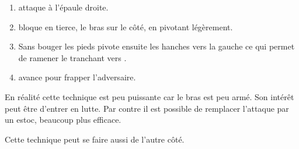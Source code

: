 \begin{technique}

\begin{enumerate}
	\item \A attaque à l'épaule droite.
	
	\item \D bloque en tierce, le bras sur le côté, en pivotant légèrement.
	
	\item Sans bouger les pieds \D pivote ensuite les hanches vers la gauche ce qui permet de ramener le tranchant vers \A.
	
	\item \D avance pour frapper l'adversaire.
\end{enumerate}

En réalité cette technique est peu puissante car le bras est peu armé.
Son intérêt peut être d'entrer en lutte.
Par contre il est possible de remplacer l'attaque par un estoc, beaucoup plus efficace.

Cette technique peut se faire aussi de l'autre côté.
\end{technique}
